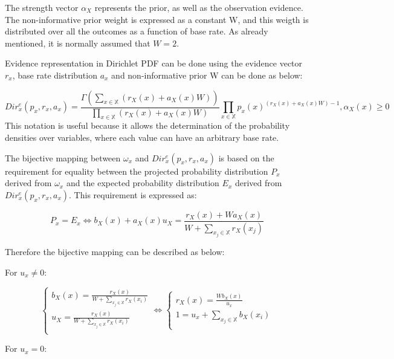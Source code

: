 \documentclass[UTF8]{article}
\begin{document}
The strength vector $\alpha_X$ represents the prior, as well as the observation evidence. The non-informative prior weight is expressed as a constant W, and this weigth is distributed over all the outcomes as a function of base rate. As already mentioned, it is normally assumed that $W = 2$.

Evidence representation in Dirichlet PDF can be done using the evidence vector $r_x$, base rate distribution $a_x$ and non-informative prior W can be done as below:

$$
Dir^e_x(p_x, r_x, a_x) = \frac{\Gamma\left(\sum_{x \in \mathbb{X}} (r_X(x) + a_X(x)W)\right)}{\prod_{x \in \mathbb{X}}(r_X(x) + a_X(x)W)}\prod_{x \in \mathbb{X}}p_x(x)^{(r_X(x) + a_X(x)W) - 1},   \alpha_X(x) \geq 0
$$
This notation is useful because it allows the determination of the probability densities over variables, where each value can have an arbitrary base rate.

The bijective mapping between $\omega_x$ and $Dir^e_x(p_x, r_x, a_x)$ is based on the requirement for equality between the projected probability distribution $P_x$ derived from $\omega_x$ and the expected probability distribution $E_x$ derived from $Dir^e_x(p_x, r_x, a_x)$. This requirement is expressed as:

$$
P_x = E_x
\Leftrightarrow
b_X(x) + a_X(x)u_X = \frac{r_X(x) + Wa_X(x)}{W + \sum_{x_j \in \mathbb{X}} r_X(x_j)}
$$

Therefore the bijective mapping can be described as below:

For $u_x \neq 0$:

$$
\begin{cases}
    b_X(x) = \frac{r_X(x)}{W + \sum_{x_j \in \mathbb{X}} r_X(x_i)}\\
    u_X = \frac{r_X(x)}{W + \sum_{x_j \in \mathbb{X}} r_X(x_i)}\\
\end{cases}
\Leftrightarrow
\begin{cases}
    r_X(x) = \frac{Wb_X(x)}{u_x}\\
    1 = u_x + \sum_{x_j \in \mathbb{X}} b_X(x_i)\\
\end{cases}
$$

For $u_x = 0$:
\end{document}

